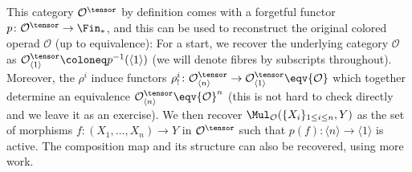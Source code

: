 \documentclass[topology]{bsteffan-notes}
\newcommand{\cO}{{\mathcal{O}}}
\begin{document}
This category $\cO^\tensor$ by definition comes with a forgetful functor $p\colon \cO^\tensor \to \Fin_*$, and this can be used to reconstruct the original colored operad $\cO$ (up to equivalence):
For a start, we recover the underlying category $\cO$ as $\cO^\tensor_{\langle 1\rangle} \coloneq p^{-1}(\langle 1\rangle)$ (we will denote fibres by subscripts throughout).
Moreover, the $\rho^i$ induce functors $\rho^i_!\colon \cO^\tensor_{\langle n\rangle} \to \cO^\tensor_{\langle 1\rangle} \eqv \cO$ which together determine an equivalence $\cO^\tensor_{\langle n\rangle} \eqv \cO^n$ (this is not hard to check directly and we leave it as an exercise).
We then recover $\Mul_{\cO}(\{X_i\}_{1 \leq i \leq n}, Y)$ as the set of morphisms $f\colon (X_1, \ldots, X_n) \to Y$ in $\cO^\tensor$ such that $p(f)\colon \langle n\rangle \to \langle 1\rangle$ is active.
The composition map and its structure can also be recovered, using more work.
\end{document}
